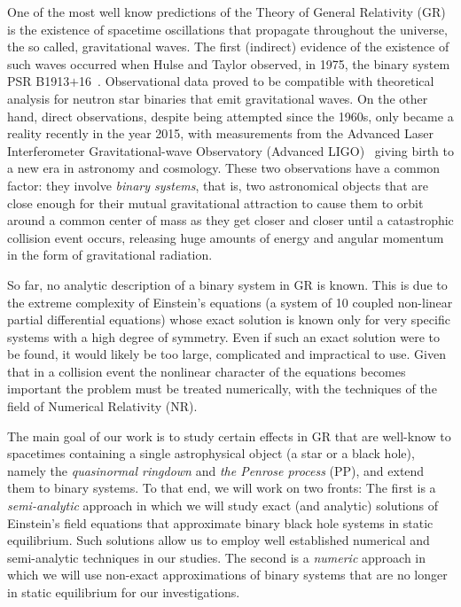 One of the most well know predictions of the Theory of General Relativity (GR) is the existence of spacetime oscillations that propagate throughout the universe, the so called, gravitational waves. The first (indirect) evidence of the existence of such waves occurred when Hulse and Taylor observed, in 1975, the binary system PSR B1913$+$16~\cite{1975ApJ...195L..51H}. Observational data proved to be compatible with theoretical analysis for neutron star binaries that emit gravitational waves. On the other hand, direct observations, despite being attempted since the 1960s, only became a reality recently in the year 2015, with measurements from the Advanced Laser Interferometer Gravitational-wave Observatory (Advanced LIGO)~\cite{grav1,grav2} giving birth to a new era in astronomy and cosmology. These two observations have a common factor: they involve \emph{binary systems}, that is, two astronomical objects that are close enough for their mutual gravitational attraction to cause them to orbit around a common center of mass as they get closer and closer until a catastrophic collision event occurs, releasing huge amounts of energy and angular momentum in the form of gravitational radiation.

So far, no analytic description of a binary system in GR is known. This is due to the extreme complexity of Einstein's equations (a system of 10 coupled non-linear partial differential equations) whose exact solution is known only for very specific systems with a high degree of symmetry. Even if such an exact solution were to be found, it would likely be too large, complicated and impractical to use. Given that in a collision event the nonlinear character of the equations becomes important the problem must be treated numerically, with the techniques of the field of Numerical Relativity (NR).

The main goal of our work is to study certain effects in GR that are well-know to spacetimes containing a single astrophysical object (a star or a black hole), namely the \emph{quasinormal ringdown} and \emph{the Penrose process} (PP), and extend them to binary systems. To that end, we will work on two fronts: The first is a \emph{semi-analytic} approach in which we will study exact (and analytic) solutions of Einstein's field equations that approximate binary black hole systems in static equilibrium. Such solutions allow us to employ well established numerical and semi-analytic techniques in our studies. The second is a \emph{numeric} approach in which we will use non-exact approximations of binary systems that are no longer in static equilibrium for our investigations.

